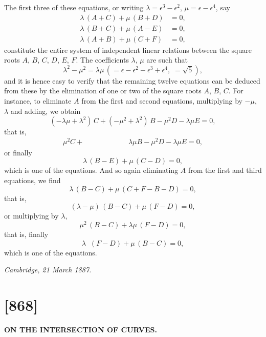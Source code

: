 \documentclass[11pt,a4paper]{book}
\begin{document}
The first three of these equations, or writing $\lambda = \epsilon^3 - \epsilon^2$,
$\mu = \epsilon - \epsilon^4$, say
\begin{align*}
\lambda\,(A + C) + \mu\,(B + D) &= 0,\\
\lambda\,(B + C) + \mu\,(A - E) &= 0,\\
\lambda\,(A + B) + \mu\,(C + F) &= 0,
\end{align*}
constitute the entire system of independent linear relations between the square roots
$A$, $B$, $C$, $D$, $E$, $F$. The coefficients $\lambda$, $\mu$ are such that
\[
\lambda^2 - \mu^2 = \lambda\mu\, (= \epsilon - \epsilon^2 - \epsilon^3 + \epsilon^4,\; = \sqrt{5}),
\]
and it is hence easy to verify that the remaining twelve equations can be deduced
from these by the elimination of one or two of the square roots $A$, $B$, $C$. For
instance, to eliminate $A$ from the first and second equations, multiplying by $-\mu$, $\lambda$
and adding, we obtain
\[
(-\lambda\mu + \lambda^2)\, C + (-\mu^2 + \lambda^2)\, B - \mu^2 D - \lambda\mu E = 0,
\]
that is,
\[
\mu^2 C + \phantom{(-\mu^2 + \lambda^2)\,}\; \lambda\mu B - \mu^2 D - \lambda\mu E = 0,
\]
or finally
\[
\lambda\,(B - E) + \mu\,(C - D) = 0,
\]
which is one of the equations. And so again eliminating $A$ from the first and
third equations, we find
\[
\lambda\,(B - C) + \mu\,(C + F - B - D) = 0,
\]
that is,
\[
(\lambda - \mu)\,(B - C) + \mu\,(F - D) = 0,
\]
or multiplying by $\lambda$,
\[
\mu^2\,(B - C) + \lambda\mu\,(F - D) = 0,
\]
that is, finally
\[
\lambda\phantom{^2}\,(F - D) + \mu\,(B - C) = 0,
\]
which is one of the equations.

\begin{flushright}
\textit{Cambridge, 21 March 1887.}
\end{flushright}

\newpage
\section*{[868]}
\begin{center}
\large\textbf{ON THE INTERSECTION OF CURVES.}
\end{center}

\begin{flushright}
\end{flushright}
\end{document}
